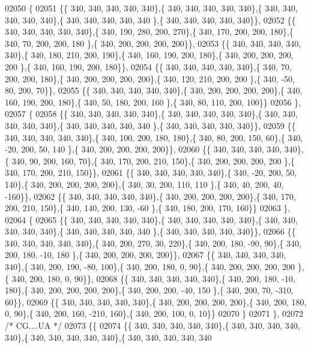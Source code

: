 \begin{DoxyCode}
02050 \{
02051 \{\{ 340, 340, 340, 340, 340\},\{ 340, 340, 340, 340, 340\},\{ 340, 340, 340, 340, 340\},\{ 340, 340, 340, 340, 340
      \},\{ 340, 340, 340, 340, 340\}\},
02052 \{\{ 340, 340, 340, 340, 340\},\{ 340, 190, 280, 200, 270\},\{ 340, 170, 200, 200, 180\},\{ 340,  70, 200, 200, 180
      \},\{ 340, 200, 200, 200, 200\}\},
02053 \{\{ 340, 340, 340, 340, 340\},\{ 340, 180, 210, 200, 190\},\{ 340, 160, 190, 200, 180\},\{ 340, 200, 200, 200, 200
      \},\{ 340, 160, 190, 200, 180\}\},
02054 \{\{ 340, 340, 340, 340, 340\},\{ 340,  70, 200, 200, 180\},\{ 340, 200, 200, 200, 200\},\{ 340, 120, 210, 200, 200
      \},\{ 340, -50,  80, 200,  70\}\},
02055 \{\{ 340, 340, 340, 340, 340\},\{ 340, 200, 200, 200, 200\},\{ 340, 160, 190, 200, 180\},\{ 340,  50, 180, 200, 160
      \},\{ 340,  80, 110, 200, 100\}\}
02056 \},
02057 \{
02058 \{\{ 340, 340, 340, 340, 340\},\{ 340, 340, 340, 340, 340\},\{ 340, 340, 340, 340, 340\},\{ 340, 340, 340, 340, 340
      \},\{ 340, 340, 340, 340, 340\}\},
02059 \{\{ 340, 340, 340, 340, 340\},\{ 340, 100, 200, 180, 180\},\{ 340,  80, 200, 150,  60\},\{ 340, -20, 200,  50, 140
      \},\{ 340, 200, 200, 200, 200\}\},
02060 \{\{ 340, 340, 340, 340, 340\},\{ 340,  90, 200, 160,  70\},\{ 340, 170, 200, 210, 150\},\{ 340, 200, 200, 200, 200
      \},\{ 340, 170, 200, 210, 150\}\},
02061 \{\{ 340, 340, 340, 340, 340\},\{ 340, -20, 200,  50, 140\},\{ 340, 200, 200, 200, 200\},\{ 340,  30, 200, 110, 110
      \},\{ 340,  40, 200,  40, -160\}\},
02062 \{\{ 340, 340, 340, 340, 340\},\{ 340, 200, 200, 200, 200\},\{ 340, 170, 200, 210, 150\},\{ 340, 140, 200, 130, -60
      \},\{ 340, 180, 200, 170, 160\}\}
02063 \},
02064 \{
02065 \{\{ 340, 340, 340, 340, 340\},\{ 340, 340, 340, 340, 340\},\{ 340, 340, 340, 340, 340\},\{ 340, 340, 340, 340, 340
      \},\{ 340, 340, 340, 340, 340\}\},
02066 \{\{ 340, 340, 340, 340, 340\},\{ 340, 200, 270,  30, 220\},\{ 340, 200, 180, -90,  90\},\{ 340, 200, 180, -10, 180
      \},\{ 340, 200, 200, 200, 200\}\},
02067 \{\{ 340, 340, 340, 340, 340\},\{ 340, 200, 190, -80, 100\},\{ 340, 200, 180,   0,  90\},\{ 340, 200, 200, 200, 200
      \},\{ 340, 200, 180,   0,  90\}\},
02068 \{\{ 340, 340, 340, 340, 340\},\{ 340, 200, 180, -10, 180\},\{ 340, 200, 200, 200, 200\},\{ 340, 200, 200, -40, 150
      \},\{ 340, 200,  70, -310,  60\}\},
02069 \{\{ 340, 340, 340, 340, 340\},\{ 340, 200, 200, 200, 200\},\{ 340, 200, 180,   0,  90\},\{ 340, 200, 160, -210, 
      160\},\{ 340, 200, 100,   0,  10\}\}
02070 \}
02071 \},
02072 \textcolor{comment}{/* CG....UA */}
02073 \{\{
02074 \{\{ 340, 340, 340, 340, 340\},\{ 340, 340, 340, 340, 340\},\{ 340, 340, 340, 340, 340\},\{ 340, 340, 340, 340, 340

\end{DoxyCode}
